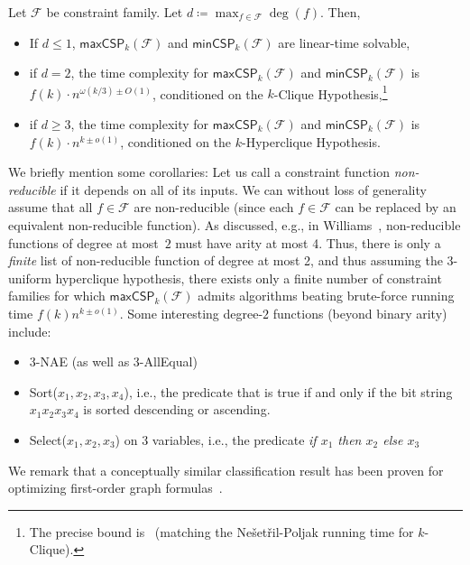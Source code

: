 \documentclass[a4paper,UKenglish,cleveref, autoref, thm-restate,numberwithinsect]{lipics-v2021}
\newcommand{\maxcspk}{\textsf{maxCSP}_{k}}
\newcommand{\mincspk}{\textsf{minCSP}_{k}}
\newcommand{\Fam}{\mathcal{F}}
\begin{document}
\begin{theorem}\label{thm:main2}
Let $\mathcal{F}$ be constraint family. Let $d \coloneqq \max_{f\in \mathcal{F}} \deg(f)$. Then,
\begin{itemize}
   \item  If $d\le 1$, $\maxcspk(\Fam)$ and $\mincspk(\Fam)$ are linear-time solvable,
   \item if $d = 2$, the time complexity for $\maxcspk(\Fam)$ and $\mincspk(\Fam)$ is $f(k) \cdot n^{\omega (k/3)\pm O(1)}$, conditioned on the $k$-Clique Hypothesis,\footnote{The precise bound is~ (matching the Ne\v{s}et\v{r}il-Poljak running time for $k$-Clique).}
   \item if $d \ge 3$, the time complexity for $\maxcspk(\Fam)$ and $\mincspk(\Fam)$ is $f(k) \cdot n^{k\pm o(1)}$, conditioned on the $k$-Hyperclique Hypothesis.
\end{itemize}
\end{theorem}

We  briefly mention some corollaries: Let us call a constraint function \emph{non-reducible} if it depends on all of its inputs. We can without loss of generality assume that all $f\in \Fam$ are non-reducible (since each $f\in \Fam$ can be replaced by an equivalent non-reducible function). As discussed, e.g., in Williams~\cite[Section 6.5]{Wil07}, non-reducible functions of degree at most~$2$ must have arity at most 4. Thus, there is only a \emph{finite} list of non-reducible function of degree at most 2, and thus assuming the 3-uniform hyperclique hypothesis, there exists only a finite number of constraint families for which $\maxcspk(\Fam)$ admits algorithms beating brute-force running time $f(k)n^{k\pm o(1)}$. 
Some interesting degree-$2$ functions (beyond binary arity) include:
\begin{itemize}
    \item \textsf{3-NAE} (as well as \textsf{3-AllEqual})
    \item \textsf{Sort($x_1,x_2,x_3,x_4$)}, i.e., the predicate that is true if and only if the bit string $x_1x_2x_3x_4$ is sorted descending or ascending.
    \item \textsf{Select}($x_1,x_2,x_3$) on 3 variables, i.e., the predicate \emph{if $x_1$ then $x_2$ else $x_3$}
\end{itemize}

We remark that a conceptually similar classification result has been proven for optimizing first-order graph formulas~\cite{BringmannCFK22}.
\end{document}
